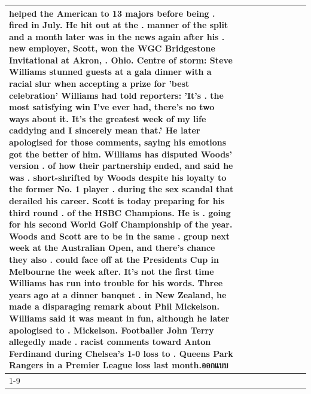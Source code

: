 \begin{table}[H]
\begin{tabular}{lllrlllll}
helped the American to 13 majors before being . fired in July. He hit out at the . manner of the split and a month later was in the news again after his . new employer, Scott, won the WGC Bridgestone Invitational at Akron, . Ohio. Centre of storm: Steve Williams stunned guests at a gala dinner with a racial slur when accepting a prize for 'best celebration' Williams had told reporters: 'It's . the most satisfying win I've ever had, there's no two ways about it. It's the greatest week of my life caddying and I sincerely mean that.' He later apologised for those comments, saying his emotions got the better of him. Williams has disputed Woods' version . of how their partnership ended, and said he was . short-shrifted by Woods despite his loyalty to the former No. 1 player . during the sex scandal that derailed his career. Scott is today preparing for his third round . of the HSBC Champions. He is . going for his second World Golf Championship of the year. Woods and Scott are to be in the same . group next week at the Australian Open, and there's chance they also . could face off at the Presidents Cup in Melbourne the week after. It's not the first time Williams has run into trouble for his words. Three years ago at a dinner banquet . in New Zealand, he made a disparaging remark about Phil Mickelson. Williams said it was meant in fun, although he later apologised to . Mickelson. Footballer John Terry allegedly made . racist comments toward Anton Ferdinand during Chelsea's 1-0 loss to . Queens Park Rangers in a Premier League loss last month.ออกแบบ \\
\cline{1-9}

\end{tabular}
\end{table}
